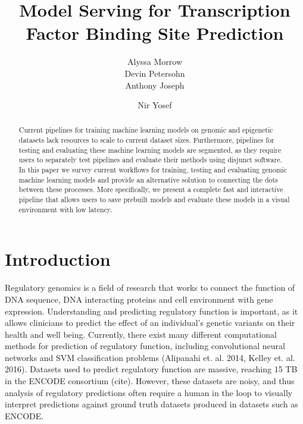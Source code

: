 \documentclass{sig-alternate-05-2015}
\begin{document}


\title{Model Serving for Transcription Factor Binding Site Prediction}



\author{
\alignauthor
Alyssa Morrow \\
\alignauthor
Devin Petersohn \\
\alignauthor Anthony Joseph \\
\and  %
\alignauthor Nir Yosef \\
}

\maketitle
\begin{abstract}
Current pipelines for training machine learning models on genomic and epigenetic datasets lack resources to scale to current dataset sizes. Furthermore, pipelines for testing and evaluating these machine learning models are segmented, as they require users to separately test pipelines and evaluate their methods using disjunct software. In this paper we survey current workflows for training, testing and evaluating genomic machine learning models and provide an alternative solution to connecting the dots between these processes. More specifically, we present a complete fast and interactive pipeline that allows users to save prebuilt models and evaluate these models in a visual environment with low latency.
\end{abstract}


\printccsdesc


\section{Introduction}
Regulatory genomics is a field of research that works to connect the function of DNA sequence, DNA interacting proteins and cell environment with gene expression. Understanding and predicting regulatory function is important, as it allows clinicians to predict the effect of an individual's genetic variants on their health and well being. Currently, there exist many different computational methods for prediction of regulatory function, including convolutional neural networks and SVM classification problems (Alipanahi et. al. 2014, Kelley et. al. 2016).  Datasets used to predict regulatory function are massive, reaching 15 TB in the ENCODE consortium (cite). However, these datasets are noisy, and thus analysis of regulatory predictions often require a human in the loop to visually interpret predictions against ground truth datasets produced in datasets such as ENCODE. \\
\end{document}
